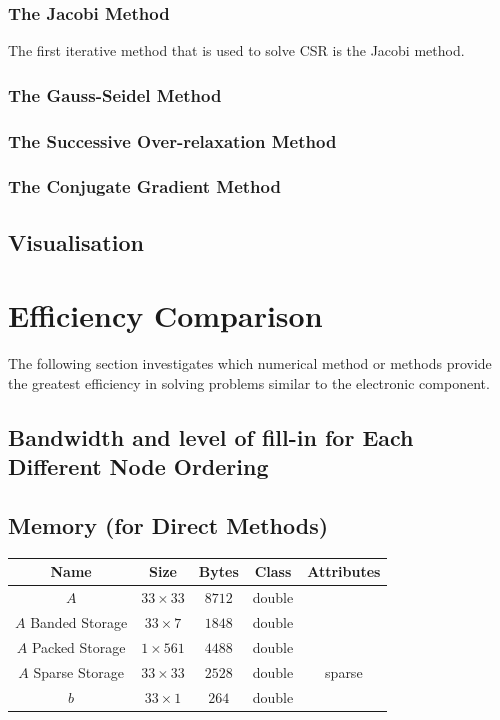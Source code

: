 \documentclass[12pt,a4paper]{article}
\begin{document}
\subsubsection{The Jacobi Method}
The first iterative method that is used to solve CSR is the Jacobi method. 

\subsubsection{The Gauss-Seidel Method}

\subsubsection{The Successive Over-relaxation Method}

\subsubsection{The Conjugate Gradient Method}

\subsection{Visualisation}

\section{Efficiency Comparison}
The following section investigates which numerical method or methods provide the greatest efficiency in solving problems similar to the electronic component.

\subsection{Bandwidth and level of fill-in for Each Different Node Ordering}


\subsection{Memory (for Direct Methods)}
\begin{center}
\begin{tabular}{c c c c c}
Name & Size & Bytes & Class & Attributes \\
\hline
$A$ & $33 \times 33$ & $8712$ & double & \\
$A$ Banded Storage & $33 \times 7$ & $1848$ & double & \\
$A$ Packed Storage & $1 \times 561$ & $4488$ & double & \\
$A$ Sparse Storage & $33 \times 33$ & $2528$ & double & sparse \\
$b$ & $33 \times 1$ & $264$ & double & \\
\end{tabular}
\end{center}
\end{document}
